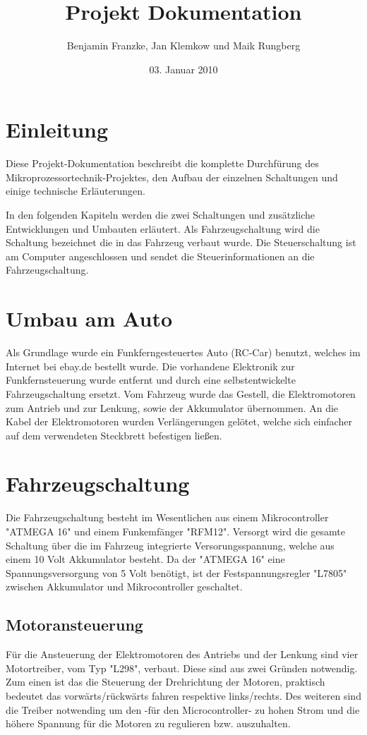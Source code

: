 \documentclass{scrartcl}
\title{Projekt Dokumentation}
\author{Benjamin Franzke, Jan Klemkow und Maik Rungberg}
\date{03. Januar 2010}
\begin{document}
\maketitle
\tableofcontents

\newpage

\section{Einleitung} %
	Diese Projekt-Dokumentation beschreibt die komplette Durchfürung des Mikroprozessortechnik-Projektes,
	den Aufbau der einzelnen Schaltungen und einige technische Erläuterungen.

	In den folgenden Kapiteln werden die zwei Schaltungen und zusätzliche Entwicklungen und Umbauten erläutert.
	Als Fahrzeugschaltung wird die Schaltung bezeichnet die in das Fahrzeug verbaut wurde.
	Die Steuerschaltung ist am Computer angeschlossen und sendet die Steuerinformationen an die Fahrzeugschaltung.

\section{Umbau am Auto} %
	Als Grundlage wurde ein Funkferngesteuertes Auto (RC-Car) benutzt,
	welches im Internet bei ebay.de bestellt wurde.
	Die vorhandene Elektronik zur Funkfernsteuerung wurde entfernt
	und durch eine selbstentwickelte Fahrzeugschaltung ersetzt.
	Vom Fahrzeug wurde das Gestell, die Elektromotoren zum Antrieb und zur Lenkung,
	sowie der Akkumulator übernommen.
	An die Kabel der Elektromotoren wurden Verlängerungen gelötet,
	welche sich einfacher auf dem verwendeten Steckbrett befestigen ließen.

\newpage

\section{Fahrzeugschaltung} %
	Die Fahrzeugschaltung besteht im Wesentlichen aus einem Mikrocontroller "ATMEGA 16" und einem Funkemfänger "RFM12".
	Versorgt wird die gesamte Schaltung über die im Fahrzeug integrierte Versorungsspannung,
	welche aus einem 10 Volt Akkumulator besteht.
	Da der "ATMEGA 16" eine Spannungsversorgung von 5 Volt benötigt, ist der Festspannungsregler "L7805"
	zwischen Akkumulator und Mikrocontroller geschaltet.

	\subsection{Motoransteuerung}
		Für die Ansteuerung der Elektromotoren des Antriebs und der Lenkung sind vier Motortreiber, vom Typ "L298", verbaut.
		Diese sind aus zwei Gründen notwendig. Zum einen ist das die Steuerung der Drehrichtung der Motoren, praktisch
		bedeutet das vorwärts/rückwärts fahren respektive links/rechts.
		Des weiteren sind die Treiber notwending um den -für den Microcontroller- zu hohen Strom und die höhere Spannung
		für die Motoren zu regulieren bzw. auszuhalten.
\end{document}

